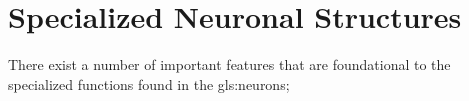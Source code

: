 \documentclass[class={myRUCProject}, crop=false]{standalone}
\begin{document}
  

\section{Specialized Neuronal Structures}
There exist a number of important features that are foundational to the specialized functions found in the \glspl{gls:neuron};
\end{document}
